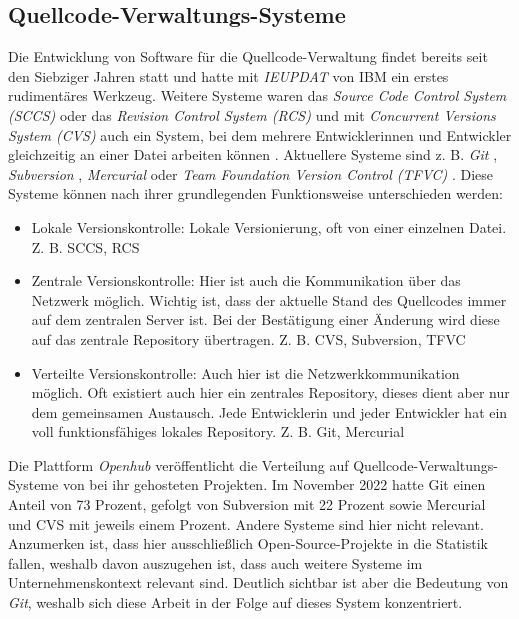 \subsection{Quellcode-Verwaltungs-Systeme}
\label{sec:implementierung:scm}

Die Entwicklung von Software für die Quellcode-Verwaltung findet bereits seit den Siebziger Jahren statt und hatte mit \emph{IEUPDAT} von IBM \cite{Museum:2022:The-IEBUPDAT:75, IBM:2022:Quick:56} ein erstes rudimentäres Werkzeug. Weitere Systeme waren das \emph{Source Code Control System (SCCS)} \cite{McMillan:2021:A-History:58} oder das \emph{Revision Control System (RCS)} \cite{GNU:2022:GNU-RCS:22} und mit \emph{Concurrent Versions System (CVS)} auch ein System, bei dem mehrere Entwicklerinnen und Entwickler gleichzeitig an einer Datei arbeiten können \cite{McMillan:2021:A-History:58}. Aktuellere Systeme sind z. B. \emph{Git} \cite{Chacon:2022:git---local-branching-on-the-cheap:32}, \emph{Subversion} \cite{The-Apache-Software-Foundation:2022:Apache:94}, \emph{Mercurial} \cite{Mercurial-Community:2022:Mercurial:74} oder \emph{Team Foundation Version Control (TFVC)} \cite{Microsoft:2022:What:67}.
Diese Systeme können nach ihrer grundlegenden Funktionsweise unterschieden werden:
\begin{itemize}
\item
Lokale Versionskontrolle: Lokale Versionierung, oft von einer einzelnen Datei. Z. B. SCCS, RCS
\item
Zentrale Versionskontrolle: Hier ist auch die Kommunikation über das Netzwerk möglich. Wichtig ist, dass der aktuelle Stand des Quellcodes immer auf dem zentralen Server ist. Bei der Bestätigung einer Änderung wird diese auf das zentrale Repository übertragen. Z. B. CVS, Subversion, TFVC
\item
Verteilte Versionskontrolle: Auch hier ist die Netzwerkkommunikation möglich. Oft existiert auch hier ein zentrales Repository, dieses dient aber nur dem gemeinsamen Austausch. Jede Entwicklerin und jeder Entwickler hat ein voll funktionsfähiges lokales Repository.  Z. B. Git, Mercurial
\end{itemize}

Die Plattform \emph{Openhub} \cite{Inc.:2022:Compare:44} veröffentlicht die Verteilung auf Quellcode-Verwaltungs-Systeme von bei ihr gehosteten Projekten.
Im November 2022 hatte Git einen Anteil von 73 Prozent, gefolgt von Subversion mit 22 Prozent sowie Mercurial und CVS mit jeweils einem Prozent. Andere Systeme sind hier nicht relevant. Anzumerken ist, dass hier ausschließlich Open-Source-Projekte in die Statistik fallen, weshalb davon auszugehen ist, dass auch weitere Systeme im Unternehmenskontext relevant sind. Deutlich sichtbar ist aber die Bedeutung von \emph{Git}, weshalb sich diese Arbeit in der Folge auf dieses System konzentriert.


